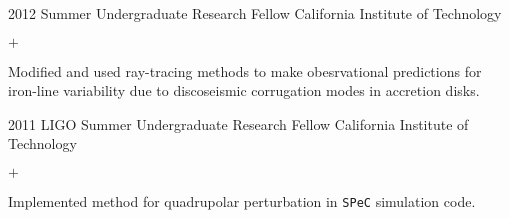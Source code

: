 \documentclass[]{luger-cv} %
\begin{document}
\begin{entrylist}
\ifdefined \onepage \else
\entry
{2012}
{Summer Undergraduate Research Fellow}
{California Institute of Technology}
{%
\vspace{-1em}
\begin{list}{$+$}{\cvlist}
\item Modified and used ray-tracing methods to make obesrvational predictions for iron-line variability due to discoseismic corrugation modes in accretion disks.
\end{list}
}


\ifdefined \onepage \else
\entry
{2011}
{LIGO Summer Undergraduate Research Fellow}
{California Institute of Technology}
{%
\vspace{-1em}
\begin{list}{$+$}{\cvlist}
\item Implemented method for quadrupolar perturbation in \texttt{SPeC} simulation code.
\end{list}
}
\fi


\end{entrylist}

\end{document}
